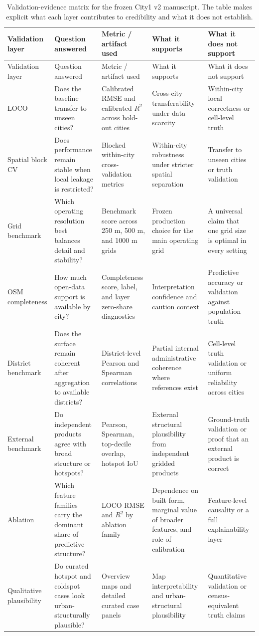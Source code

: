 \begingroup
\small
\setlength{\LTleft}{0pt}
\setlength{\LTright}{0pt}
\begin{longtable}{L{0.14\textwidth} L{0.18\textwidth} L{0.16\textwidth} L{0.20\textwidth} L{0.22\textwidth}}
\caption{Validation-evidence matrix for the frozen City1 v2 manuscript. The table makes explicit what each layer contributes to credibility and what it does not establish.}\label{tab:s1_validation_matrix}\\
\toprule
Validation layer & Question answered & Metric / artifact used & What it supports & What it does not support \\
\midrule
\endfirsthead
\toprule
Validation layer & Question answered & Metric / artifact used & What it supports & What it does not support \\
\midrule
\endhead
\bottomrule
\endfoot
LOCO & Does the baseline transfer to unseen cities? & Calibrated RMSE and calibrated $R^2$ across hold-out cities & Cross-city transferability under data scarcity & Within-city local correctness or cell-level truth \\
Spatial block CV & Does performance remain stable when local leakage is restricted? & Blocked within-city cross-validation metrics & Within-city robustness under stricter spatial separation & Transfer to unseen cities or truth validation \\
Grid benchmark & Which operating resolution best balances detail and stability? & Benchmark score across 250 m, 500 m, and 1000 m grids & Frozen production choice for the main operating grid & A universal claim that one grid size is optimal in every setting \\
OSM completeness & How much open-data support is available by city? & Completeness score, label, and layer zero-share diagnostics & Interpretation confidence and caution context & Predictive accuracy or validation against population truth \\
District benchmark & Does the surface remain coherent after aggregation to available districts? & District-level Pearson and Spearman correlations & Partial internal administrative coherence where references exist & Cell-level truth validation or uniform reliability across cities \\
External benchmark & Do independent products agree with broad structure or hotspots? & Pearson, Spearman, top-decile overlap, hotspot IoU & External structural plausibility from independent gridded products & Ground-truth validation or proof that an external product is correct \\
Ablation & Which feature families carry the dominant share of predictive structure? & LOCO RMSE and $R^2$ by ablation family & Dependence on built form, marginal value of broader features, and role of calibration & Feature-level causality or a full explainability layer \\
Qualitative plausibility & Do curated hotspot and coldspot cases look urban-structurally plausible? & Overview maps and detailed curated case panels & Map interpretability and urban-structural plausibility & Quantitative validation or census-equivalent truth claims \\
\end{longtable}
\endgroup

